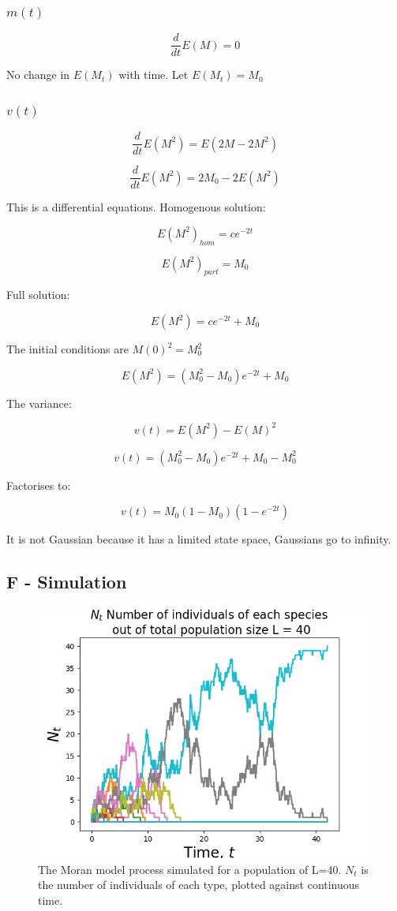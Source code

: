 \documentclass{article}
\begin{document}
\subsubsection{$m(t)$}

$$\frac{d}{dt}E(M) = 0$$

No change in $E(M_t)$ with time. Let $E(M_t) = M_0$

\subsubsection{$v(t)$}

$$\frac{d}{dt}E(M^2) = E(2M - 2M^2)$$

$$\frac{d}{dt}E(M^2) = 2M_0 - 2E(M^2)$$

This is a differential equations. Homogenous solution:

$$E(M^2)_{hom} = c e^{-2t}$$

$$E(M^2)_{part} = M_0$$

Full solution:

$$E(M^2) = c e^{-2t} + M_0$$

The initial conditions are $M(0)^2 = M_0^2$ 

$$E(M^2) = (M_0^2 -M_0)e^{-2t} + M_0$$

The variance:

$$v(t) = E(M^2) - E(M)^2$$

$$v(t) = (M_0^2 -M_0)e^{-2t} + M_0 - M_0^2$$

Factorises to:

$$v(t) = M_0(1-M_0)(1-e^{-2t})$$

It is not Gaussian because it has a limited state space, Gaussians go to infinity.

\subsection{F - Simulation}

\begin{figure}[H]
\includegraphics[scale=0.8]{moran_a.png} 
\caption{The Moran model process simulated for a population of L=40. $N_t$ is the number of individuals of each type, plotted against continuous time.} 
\label{fig:moran}
\end{figure}
\end{document}
